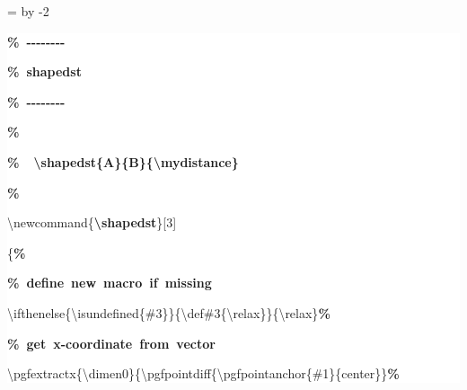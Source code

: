 \begingroup
\ttfamily
{}
=\textwidth
\advance{} by -2\fboxsep
\noindent
\colorbox{background}
{%
\parbox{\dimen255}
{%
\rule[-0.5ex]{0pt}{2.5ex}\hspace*{0.0em}\textcolor{G}{\textbf{\%~{-}{-}{-}{-}{-}{-}{-}{-}}}\\
\rule[-0.5ex]{0pt}{2.5ex}\hspace*{0.0em}\textcolor{G}{\textbf{\%~shapedst}}\\
\rule[-0.5ex]{0pt}{2.5ex}\hspace*{0.0em}\textcolor{G}{\textbf{\%~{-}{-}{-}{-}{-}{-}{-}{-}}}\\
\rule[-0.5ex]{0pt}{2.5ex}\hspace*{0.0em}\textcolor{G}{\textbf{\%}}\\
\rule[-0.5ex]{0pt}{2.5ex}\hspace*{0.0em}\textcolor{G}{\textbf{\%~~\textbackslash{}shapedst\{A\}\{B\}\{\textbackslash{}mydistance\}}}\\
\rule[-0.5ex]{0pt}{2.5ex}\hspace*{0.0em}\textcolor{G}{\textbf{\%}}\\
\rule[-0.5ex]{0pt}{2.5ex}\hspace*{0.0em}\textbackslash{}newcommand\{\textcolor{R}{\textbf{\textbackslash{}shapedst}}\}[3]\\
\rule[-0.5ex]{0pt}{2.5ex}\hspace*{0.0em}\{\textcolor{G}{\textbf{\%}}\\
\rule[-0.5ex]{0pt}{2.5ex}\hspace*{1.0em}\textcolor{G}{\textbf{\%~define~new~macro~if~missing}}\\
\rule[-0.5ex]{0pt}{2.5ex}\hspace*{1.0em}\textbackslash{}ifthenelse\{\textbackslash{}isundefined\{\#3\}\}\{\textbackslash{}def\#3\{\textbackslash{}relax\}\}\{\textbackslash{}relax\}\textcolor{G}{\textbf{\%}}\\
\rule[-0.5ex]{0pt}{2.5ex}\hspace*{1.0em}\textcolor{G}{\textbf{\%~get~x{-}coordinate~from~vector}}\\
\rule[-0.5ex]{0pt}{2.5ex}\hspace*{1.0em}\textbackslash{}pgfextractx\{\textbackslash{}dimen0\}\{\textbackslash{}pgfpointdiff\{\textbackslash{}pgfpointanchor\{\#1\}\{center\}\}\textcolor{G}{\textbf{\%}}\\
}}
